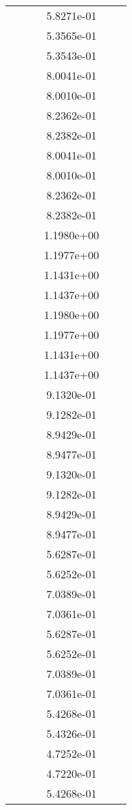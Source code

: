 \begin{xltabular}{\textwidth}{r|rS[table-format=1.3e+2]S[table-format=1.4e+2]S[table-format=1.4e+2]S[table-format=-1.5]}
&  &  & 5.8271e-01 & & \\
&  &  & 5.3565e-01 & & \\
&  &  & 5.3543e-01 & & \\
&  &  & 8.0041e-01 & & \\
&  &  & 8.0010e-01 & & \\
&  &  & 8.2362e-01 & & \\
&  &  & 8.2382e-01 & & \\
&  &  & 8.0041e-01 & & \\
&  &  & 8.0010e-01 & & \\
&  &  & 8.2362e-01 & & \\
&  &  & 8.2382e-01 & & \\
&  &  & 1.1980e+00 & & \\
&  &  & 1.1977e+00 & & \\
&  &  & 1.1431e+00 & & \\
&  &  & 1.1437e+00 & & \\
&  &  & 1.1980e+00 & & \\
&  &  & 1.1977e+00 & & \\
&  &  & 1.1431e+00 & & \\
&  &  & 1.1437e+00 & & \\
&  &  & 9.1320e-01 & & \\
&  &  & 9.1282e-01 & & \\
&  &  & 8.9429e-01 & & \\
&  &  & 8.9477e-01 & & \\
&  &  & 9.1320e-01 & & \\
&  &  & 9.1282e-01 & & \\
&  &  & 8.9429e-01 & & \\
&  &  & 8.9477e-01 & & \\
&  &  & 5.6287e-01 & & \\
&  &  & 5.6252e-01 & & \\
&  &  & 7.0389e-01 & & \\
&  &  & 7.0361e-01 & & \\
&  &  & 5.6287e-01 & & \\
&  &  & 5.6252e-01 & & \\
&  &  & 7.0389e-01 & & \\
&  &  & 7.0361e-01 & & \\
&  &  & 5.4268e-01 & & \\
&  &  & 5.4326e-01 & & \\
&  &  & 4.7252e-01 & & \\
&  &  & 4.7220e-01 & & \\
&  &  & 5.4268e-01 & & \\

\end{xltabular}
